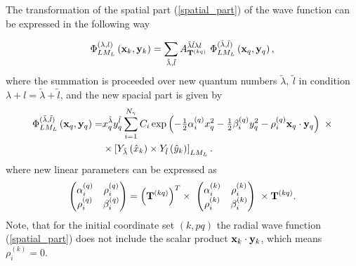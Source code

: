\documentclass[
12pt, %
oneside, %
english, %
doublespacing, %
doublespacing, %
toctotoc, %
parskip, %
headsepline, %
]{MastersDoctoralThesis} %
\begin{document}

The transformation of the spatial part (\ref{spatial_part}) of the wave function can be expressed in the following way \cite{suzuki1998stochastic, kukulin1990dynamic}

  \begin{equation}
 \label{transform_spatial_part}
 \Phi^{(\lambda,l)}_{LM_L}\left( {\bf x}_k, {\bf y}_k \right) = \sum_{\tilde{\lambda}, \tilde{l}} A^{\tilde{\lambda} \tilde{l} \lambda l}_{{\bf T}^{(kq)} }~
  \Phi_{LM_L}^{(\tilde{\lambda},\tilde{l}) } \left(  {\bf x}_q, {\bf y}_q \right) ,
 \end{equation}
where the summation is proceeded over new quantum numbers $\tilde{\lambda},~\tilde{l}$ in condition $\lambda+l=\tilde{\lambda}+\tilde{l}$, and the new spacial part is given by
\begin{align}
 \Phi_{LM_L}^{(\tilde{\lambda},\tilde{l}) } \left(  {\bf x}_q, {\bf y}_q \right)  =  &
x^{\tilde{\lambda}}_q y^{\tilde{l}}_q 
\sum_{i=1}^{N_\gamma} C_i 
\exp\left( - \tfrac{1}{2} \alpha_i^{(q)} x^2_q -\tfrac{1}{2}  \beta_i^{(q)} y^2_q 
- \rho_i^{(q)}   {\bf x}_q \cdot {\bf y}_q 
   \right)~
\times \nonumber \\
& \times \left[ 
Y_{\tilde{\lambda}} \left(\hat{x}_k \right) \times Y_{\tilde{l}} \left(\hat{y}_k \right)
\right]_{LM_L}.
\label{new_spacial_part}
\end{align}
where new linear parameters can be expressed as
\begin{align}
\begin{pmatrix}
\alpha_i^{(q)} & \rho_i^{(q)} \\ 
\rho_i^{(q)} & \beta_i^{(q)}
\end{pmatrix}  = \left( {\bf T}^{(kq)} \right)^{T} \times  ~
\begin{pmatrix}
\alpha_i^{(k)} & \rho_i^{(k)} \\ 
\rho_i^{(k)} & \beta_i^{(k)}
\end{pmatrix} ~ \times
  {\bf T}^{(kq)}.
\end{align}
Note, that for the initial  coordinate set $(k,pq)$ the radial wave function (\ref{spatial_part}) does not include the scalar product ${\bf x}_k \cdot {\bf y}_k$, which means $\rho_i^{(k)}=0$.  
\end{document}

